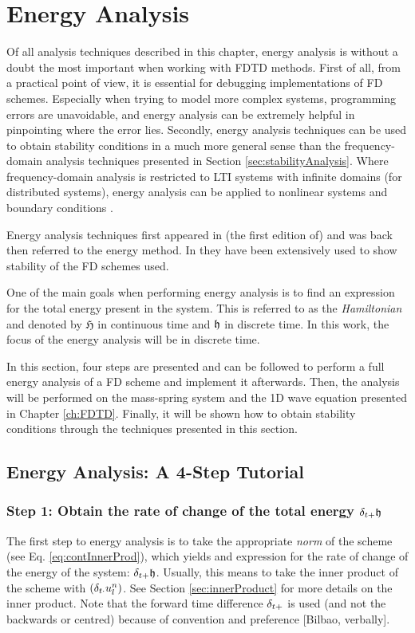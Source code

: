 {{\section{Energy Analysis}\label{sec:energyAnalysis}
Of all analysis techniques described in this chapter, energy analysis is without a doubt the most important when working with FDTD methods. 
First of all, from a practical point of view, it is essential for debugging implementations of FD schemes. Especially when trying to model more complex systems, programming errors are unavoidable, and energy analysis can be extremely helpful in pinpointing where the error lies. 
Secondly, energy analysis techniques can be used to obtain stability conditions in a much more general sense than the frequency-domain analysis techniques presented in Section \ref{sec:stabilityAnalysis}. Where frequency-domain analysis is restricted to LTI systems with infinite domains (for distributed systems), energy analysis can be applied to nonlinear systems and boundary conditions \cite{theBible}. 

Energy analysis techniques first appeared in (the first edition of) \cite{Gustafsson2013} and was back then referred to the energy method. In \cite{theBible} they have been extensively used to show stability of the FD schemes used. 

One of the main goals when performing energy analysis is to find an expression for the total energy present in the system. This is referred to as the \textit{Hamiltonian} and denoted by $\mathfrak{H}$ in continuous time and $\mathfrak{h}$ in discrete time. In this work, the focus of the energy analysis will be in discrete time. %

In this section, four steps are presented and can be followed to perform a full energy analysis of a FD scheme and implement it afterwards. Then, the analysis will be performed on the mass-spring system and the 1D wave equation presented in Chapter \ref{ch:FDTD}. Finally, it will be shown how to obtain stability conditions through the techniques presented in this section. 

\subsection{Energy Analysis: A 4-Step Tutorial}

\subsubsection{Step 1: Obtain the rate of change of the total energy $\delta_{t+} \mathfrak{h}$}
The first step to energy analysis is to take the appropriate \textit{norm} of the scheme (see Eq. \eqref{eq:contInnerProd}), which yields and expression for the rate of change of the energy of the system: $\delta_{t+}\mathfrak{h}$. Usually, this means to take the inner product of the scheme with $(\delta_{t\cdot} u_l^n)$. See Section \ref{sec:innerProduct} for more details on the inner product. Note that the forward time difference $\delta_{t+}$ is used (and not the backwards or centred) because of convention and preference [Bilbao, verbally].

}}
